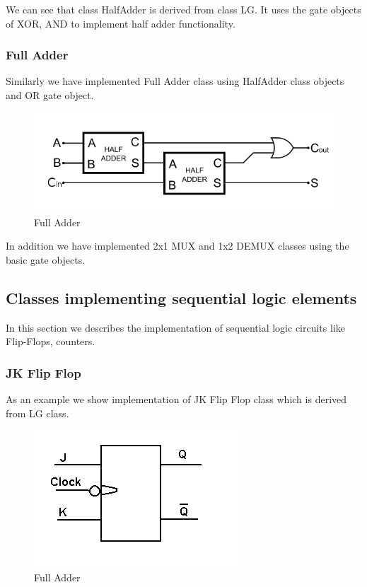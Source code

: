 \documentclass[a4paper,12pt]{article}
\begin{document}


We can see that class HalfAdder is derived from class LG. It uses the gate objects of XOR, AND to implement half adder functionality.

\subsubsection{Full Adder}

Similarly we have implemented Full Adder class using HalfAdder class objects and OR gate object.

\begin{figure}[h]
\centering
\includegraphics[scale=0.5]{fulladder.png}%
\caption{Full Adder}
\end{figure} 




In addition we have implemented 2x1 MUX and 1x2 DEMUX classes using the basic gate objects.

\subsection{Classes implementing sequential logic elements}

In this section we describes the implementation of sequential logic circuits like Flip-Flops, counters.

\subsubsection{JK Flip Flop}

As an example we show implementation of JK Flip Flop class which is derived from LG class.

\begin{figure}[h]
\centering
\includegraphics[scale=0.75]{jkflop.png}%
\caption{Full Adder}
\end{figure} 
\end{document}
